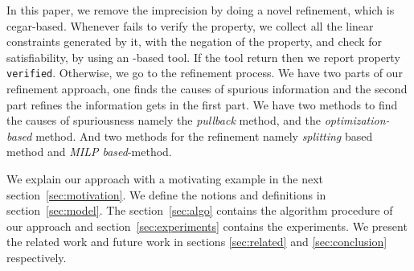 In this paper, we remove the imprecision by doing a novel refinement, which is cegar-based. 
Whenever \deeppoly{} fails to verify the property, we collect all the linear constraints generated by it, 
with the negation of the property, and check for satisfiability, by using an \milp{}-based tool. 
If the tool return \unsat{} then we report property \texttt{verified}. Otherwise, we go to the refinement process.
We have two parts of our refinement approach, one finds the causes of spurious information 
and the second part refines the information gets in the first part. 
We have two methods to find the causes of spuriousness namely the {\em pullback} method, and the 
{\em optimization-based} method. And two methods for the refinement namely {\em splitting} based method and 
{\em MILP based}-method.    

We explain our approach with a motivating example in the next section~\ref{sec:motivation}. 
We define the notions and definitions in section~\ref{sec:model}. The section~\ref{sec:algo} contains the 
algorithm procedure of our approach and section~\ref{sec:experiments} contains the experiments. 
We present the related work and future work in sections \ref{sec:related} and \ref{sec:conclusion} respectively. 



